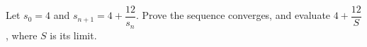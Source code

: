 Let $s_0=4$ and $s_{n+1}=4+\dfrac{12}{s_n}$. Prove the sequence converges, and evaluate $4+\dfrac{12}{S}$, where $S$ is its limit.
